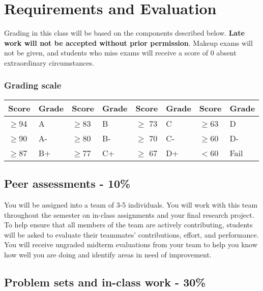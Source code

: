 \documentclass[11pt]{article}
\begin{document}
\section*{Requirements and Evaluation}

Grading in this class will be based on the components described
below. \textbf{Late work will not be accepted without prior
  permission}. Makeup exams will not be given, and students who miss
exams will receive a score of 0 absent extraordinary circumstances.

\subsubsection*{Grading scale}
\vspace{2mm}

\begin{center}
\begin{tabular}{| l l | l l | l l | l l |}
\hline
Score & Grade & Score & Grade & Score & Grade& Score & Grade \\
\hline
$\ge$94 & A  & $\ge$83 & B & $\ge$ 73 &  C &$\ge$63 & D   \\
$\ge$90 & A-  & $\ge$80 & B- & $\ge$ 70 &  C- &$\ge$60 & D- \\
$\ge$87 & B+ & $\ge$77 & C+ & $\ge$ 67 &  D+& $<$60 & Fail \\
\hline

\end{tabular}
\end{center}



\subsection*{Peer assessments - 10\%}

You will be assigned into a team of 3-5
individuals.  You will work with this team throughout the semester on
in-class assignments and your final research project.  To help ensure
that all members of the team are actively contributing, students will
be asked to evaluate their teammates' contributions, effort, and
performance.  You will receive ungraded midterm evaluations from your
team to help you know how well you are doing and identify areas in
need of improvement. 


\subsection*{Problem sets and in-class work - 30\%}
\end{document}
